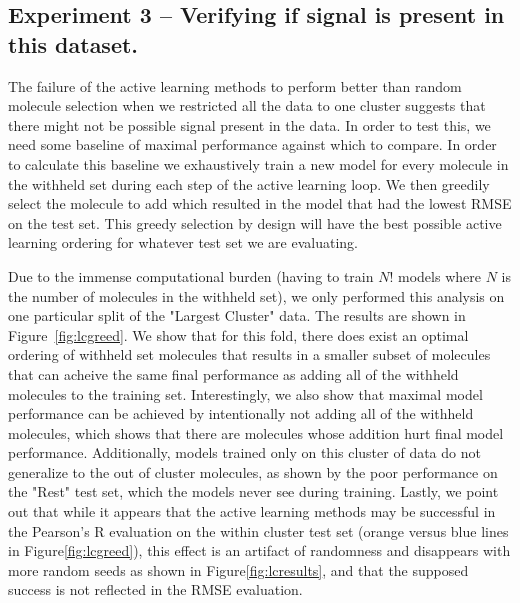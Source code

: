 \documentclass[journal=jmcmar,manuscript=article]{achemso}
\begin{document}
\subsection{Experiment 3 -- Verifying if signal is present in this dataset.}
The failure of the active learning methods to perform better than random molecule selection when we restricted all the data to one cluster suggests that there might not be possible signal present in the data. In order to test this, we need some baseline of maximal performance against which to compare. In order to calculate this baseline we exhaustively train a new model for every molecule in the withheld set during each step of the active learning loop. We then greedily select the molecule to add which resulted in the model that had the lowest RMSE on the test set. This greedy selection by design will have the best possible active learning ordering for whatever test set we are evaluating.

Due to the immense computational burden (having to train $N!$ models where $N$ is the number of molecules in the withheld set), we only performed this analysis on one particular split of the "Largest Cluster" data. The results are shown in Figure~\ref{fig:lcgreed}. We show that for this fold, there does exist an optimal ordering of withheld set molecules that results in a smaller subset of molecules that can acheive the same final performance as adding all of the withheld molecules to the training set. Interestingly, we also show that maximal model performance can be achieved by intentionally not adding all of the withheld molecules, which shows that there are molecules whose addition hurt final model performance. Additionally, models trained only on this cluster of data do not generalize to the out of cluster molecules, as shown by the poor performance on the "Rest" test set, which the models never see during training. Lastly, we point out that while it appears that the active learning methods may be successful in the Pearson's R evaluation on the within cluster test set (orange versus blue lines in Figure\ref{fig:lcgreed}), this effect is an artifact of randomness and disappears with more random seeds as shown in Figure\ref{fig:lcresults}, and that the supposed success is not reflected in the RMSE evaluation.
\end{document}

